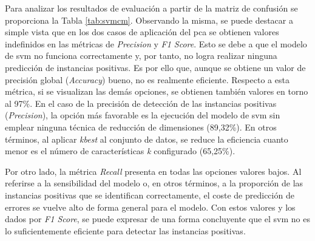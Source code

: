 \vspace{3mm}

Para analizar los resultados de evaluación a partir de la matriz de confusión se proporciona la Tabla \ref{tab:svmcm}. Observando la misma, se puede destacar a simple vista que en los dos casos de aplicación del \gls{pca} se obtienen valores indefinidos en las métricas de \textit{Precision} y \textit{F1 Score}. Esto se debe a que el modelo de \gls{svm} no funciona correctamente y, por tanto, no logra realizar ninguna predicción de instancias positivas. Es por ello que, aunque se obtiene un valor de precisión global (\textit{Accuracy}) bueno, no es realmente eficiente. Respecto a esta métrica, si se visualizan las demás opciones, se obtienen también valores en torno al 97\%. En el caso de la precisión de detección de las instancias positivas (\textit{Precision}), la opción más favorable es la ejecución del modelo de \gls{svm} sin emplear ninguna técnica de reducción de dimensiones (89,32\%). En otros términos, al aplicar \textit{kbest} al conjunto de datos, se reduce la eficiencia cuanto menor es el número de características \textit{k} configurado (65,25\%).

\vspace{3mm}

Por otro lado, la métrica \textit{Recall} presenta en todas las opciones valores  bajos. Al referirse a la sensibilidad del modelo o, en otros términos, a la proporción de las instancias positivas que se identifican correctamente, el coste de predicción de errores se vuelve alto de forma general para el modelo. Con estos valores y los dados por \textit{F1 Score}, se puede expresar de una forma concluyente que el \gls{svm} no es lo suficientemente eficiente para detectar las instancias positivas. 

\vspace{3mm}


